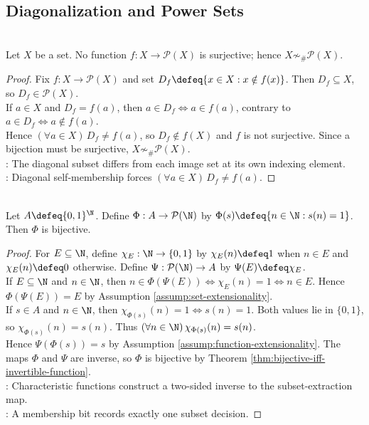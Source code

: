 \subsection{Diagonalization and Power Sets}

\begin{theorem} \label{thm:cantor-power-set-theorem} \\
Let $X$ be a set. No function $f:X\to\mathcal{P}(X)$ is surjective; hence $X\not\sim_{\#}\mathcal{P}(X)$.
\begin{proof}
Fix $f:X\to\mathcal{P}(X)$ and set $D_f\defeq\{x\in X:x\notin f(x)\}$. Then $D_f\subseteq X$, so $D_f\in\mathcal{P}(X)$.\\
If $a\in X$ and $D_f=f(a)$, then $a\in D_f\Longleftrightarrow a\in f(a)$, contrary to $a\in D_f\Longleftrightarrow a\notin f(a)$.\\
Hence $(\forall a\in X)\,D_f\neq f(a)$, so $D_f\notin f(X)$ and $f$ is not surjective. Since a bijection must be surjective, $X\not\sim_{\#}\mathcal{P}(X)$.\\
: The diagonal subset differs from each image set at its own indexing element.\\
: Diagonal self-membership forces $(\forall a\in X)\,D_f\neq f(a)$.
\end{proof}
\end{theorem}

\begin{proposition} \label{prop:binary-sequences-model-power-set} \\
Let $A\defeq\{0,1\}^{\N}$. Define $\Phi:A\to\mathcal{P}(\N)$ by $\Phi(s)\defeq\{n\in\N:s(n)=1\}$. Then $\Phi$ is bijective.
\begin{proof}
For $E\subseteq\N$, define $\chi_E:\N\to\{0,1\}$ by $\chi_E(n)\defeq1$ when $n\in E$ and $\chi_E(n)\defeq0$ otherwise. Define $\Psi:\mathcal{P}(\N)\to A$ by $\Psi(E)\defeq\chi_E$.\\
If $E\subseteq\N$ and $n\in\N$, then $n\in\Phi(\Psi(E))\Longleftrightarrow\chi_E(n)=1\Longleftrightarrow n\in E$. Hence $\Phi(\Psi(E))=E$ by Assumption \ref{assump:set-extensionality}.\\
If $s\in A$ and $n\in\N$, then $\chi_{\Phi(s)}(n)=1\Longleftrightarrow s(n)=1$. Both values lie in $\{0,1\}$, so $\chi_{\Phi(s)}(n)=s(n)$. Thus $(\forall n\in\N)\,\chi_{\Phi(s)}(n)=s(n)$.\\
Hence $\Psi(\Phi(s))=s$ by Assumption \ref{assump:function-extensionality}. The maps $\Phi$ and $\Psi$ are inverse, so $\Phi$ is bijective by Theorem \ref{thm:bijective-iff-invertible-function}.\\
: Characteristic functions construct a two-sided inverse to the subset-extraction map.\\
: A membership bit records exactly one subset decision.
\end{proof}
\end{proposition}

